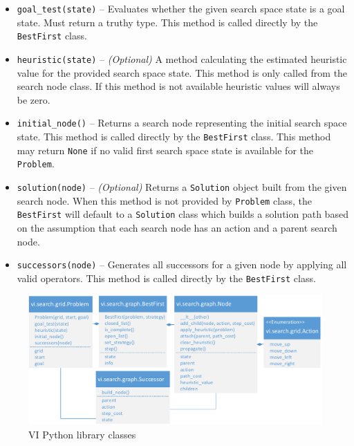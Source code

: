 \begin{itemize}
\item \texttt{goal\_test(state)} -- Evaluates whether the given search space state is a goal state. Must return a truthy type. This method is called directly by the \texttt{BestFirst} class.
\item \texttt{heuristic(state)} -- \textit{(Optional)} A method calculating the estimated heuristic value for the provided search space state. This method is only called from the search node class. If this method is not available heuristic values will always be zero.
\item \texttt{initial\_node()} -- Returns a search node representing the initial search space state. This method is called directly by the \texttt{BestFirst} class. This method may return \texttt{None} if no valid first search space state is available for the \texttt{Problem}.
\item \texttt{solution(node)} -- \textit{(Optional)} Returns a \texttt{Solution} object built from the given search node. When this method is not provided by \texttt{Problem} class, the \texttt{BestFirst} will default to a \texttt{Solution} class which builds a solution path based on the assumption that each search node has an action and a parent search node.
\item \texttt{successors(node)} -- Generates all successors for a given node by applying all valid operators. This method is called directly by the \texttt{BestFirst} class.
\end{itemize}



\begin{figure}[p]
\includegraphics[width=\linewidth,scale=0.1]{images/vi_class_hierarchy}
\caption{VI Python library classes}
\label{figure:vi_classes}
\end{figure}

